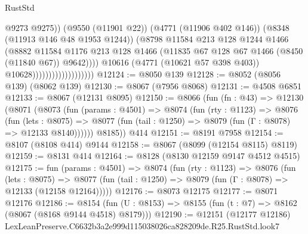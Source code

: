 \begin{lexlean}{RustStd}
\begin{coremodule}
                                                @9273
                                                @9275))
                                            (@9550 (@11901 @22))
                                            (@4771 (@11906 @402 @146))
                                            (@8348 (@11913 @146 @48 @1953 @1244))
                                            (@8798
                                              @11584
                                              @213
                                              @128
                                              @1244
                                              @1466
                                              (@8882
                                                @11584
                                                @1176
                                                @213
                                                @128
                                                @1466
                                                (@11835
                                                  @67
                                                  @128
                                                  @67
                                                  @1466
                                                  (@8450 (@11840 @67))
                                                  @9642))))
                                          @10616
                                          (@4771 (@10621 @57 @398 @403))
                                          @10628)))))))))))))))))))
@12124 := @8050 @139
@12128 := @8052 (@8056 @139) (@8062 @139)
@12130 := @8067 (@7956 @8068)
@12131 := @4508 @6851
@12133 := @8067 (@12131 @8095)
@12150 := @8066
    (fun (fn : @43) =>
    @12130
      (@8071
        (@8073
          (fun (params : @4501) =>
          @8074
            (fun (rty : @1123) =>
            @8076
              (fun (lets : @8075) =>
              @8077 (fun (tail : @1250) => @8079 (fun (Γ : @8078) => @12133 @8140))))))
        @8185))
    @414
@12151 := @8191 @7958
@12154 := @8107 (@8108 @414) @9144
@12158 := @8067 (@8099 (@12154 @8115) @8119)
@12159 := @8131 @414
@12164 := @8128 (@8130 @12159 @9147 @4512 @4515)
@12175 := fun (params : @4501) =>
  @8074
    (fun (rty : @1123) =>
    @8076
      (fun (lets : @8075) =>
      @8077 (fun (tail : @1250) => @8079 (fun (Γ : @8078) => @12133 (@12158 @12164)))))
@12176 := @8073 @12175
@12177 := @8071 @12176
@12186 := @8154 (fun (U : @8153) => @8155 (fun (t : @7) => @8162 (@8067 (@8168 @9144 @4518) @8179)))
@12190 := @12151 (@12177 @12186) LexLeanPreserve.C6632b3a2e999d115038026ca828209de.R25.RustStd.look7

\end{coremodule}
\end{lexlean}
